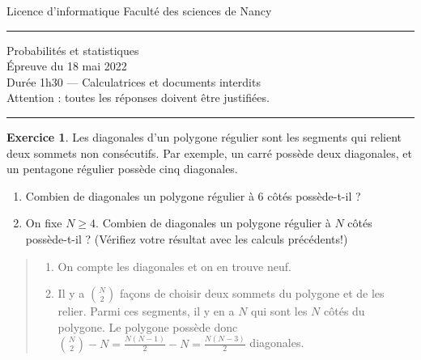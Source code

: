 \documentclass[11pt]{article}
\theoremstyle{definition}
\newtheorem{exo}{Exercice}
\newenvironment{solution}{\begin{quote}\color{teal}}{\end{quote}}
\begin{document}
\noindent Licence d'informatique \hfill Faculté des sciences de Nancy\\
\noindent\rule{\linewidth}{1pt}
\begin{center}
Probabilités et statistiques\\
Épreuve du 18 mai 2022\\
Durée 1h30 --- Calculatrices et documents interdits\\
Attention : toutes les réponses doivent être justifiées.
\end{center}
\noindent\rule{\linewidth}{1pt}




\begin{exo}
Les diagonales d'un polygone régulier sont les segments qui relient deux sommets non consécutifs. Par exemple, un carré possède deux diagonales, et un pentagone régulier possède cinq diagonales.

\begin{enumerate}
\item Combien de diagonales un polygone régulier à 6 côtés possède-t-il ?
\item On fixe $N\geq 4$. Combien de diagonales un polygone régulier à $N$ côtés possède-t-il ? (Vérifiez votre résultat avec les calculs précédents!)
\end{enumerate}
\begin{solution}
\begin{enumerate}
\item On compte les diagonales et on en trouve neuf.
\item Il y a $\binom{N}{2}$ façons de choisir deux sommets du polygone et de les relier. Parmi ces segments, il y en a $N$ qui sont les $N$ côtés du polygone. Le polygone possède donc $\binom{N}{2}-N = \frac{N(N-1)}{2}-N = \frac{N(N-3)}{2}$ diagonales.\end{enumerate}
\end{solution}
\end{exo}
\end{document}

